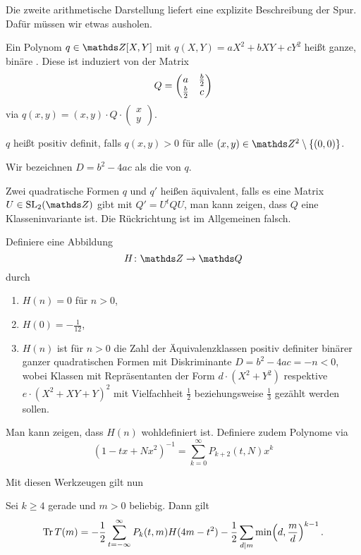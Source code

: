 Die zweite arithmetische Darstellung liefert eine explizite Beschreibung der Spur.
Dafür müssen wir etwas ausholen.

\begin{defi}
	Ein Polynom $q \in \ZZ[X, Y]$ mit $q(X,Y) = aX^2 + bXY + cY^2$ heißt ganze, binäre .
	Diese ist induziert von der Matrix
	\[
	Q = \mymat*{a}{\frac{b}{2}}{\frac{b}{2}}{c}
	\]
	via $q(x,y) = (x, y) \cdot Q \cdot (\begin{smallmatrix} x \\ y \end{smallmatrix})$.
	
	$q$ heißt positiv definit, falls $q(x,y) > 0$ für alle $(x,y) \in \ZZ^2\setminus\{(0,0)\}$.
	
	Wir bezeichnen $D = b^2 - 4ac$ als die  von $q$.
	
	Zwei quadratische Formen $q$ und $q'$ heißen äquivalent, falls es eine Matrix $U \in \SL_2(\ZZ)$ gibt mit $Q' = U^t Q U$, man kann zeigen, dass $Q$ eine Klasseninvariante ist.
	Die Rückrichtung ist im Allgemeinen falsch.
	
	Definiere eine Abbildung
	\[
	H\colon \ZZ \ra \QQ
	\]
	durch
	\begin{enumerate}
		\item $H(n) = 0$ für $n > 0$,
		\item $H(0) = - \frac{1}{12}$,
		\item $H(n)$ ist für $n > 0$ die Zahl der Äquivalenzklassen positiv definiter binärer ganzer quadratischen Formen mit Diskriminante $D = b^2-4ac = -n < 0$, wobei Klassen mit Repräsentanten der Form $d\cdot (X^2 + Y^2)$ respektive $e \cdot (X^2 + XY + Y)^2$ mit Vielfachheit $\frac{1}{2}$ beziehungsweise $\frac{1}{3}$ gezählt werden sollen.
	\end{enumerate}
	Man kann zeigen, dass $H(n)$ wohldefiniert ist.
	Definiere zudem Polynome via
	\[
	(1-tx+Nx^2)^{-1} = \sum_{k=0}^\infty P_{k+2}(t,N) x^k
	\]
\end{defi}

Mit diesen Werkzeugen gilt nun
\begin{theorem}
	Sei $k \geq 4$ gerade und $m > 0$ beliebig. Dann gilt
	\begin{equation}\label{eq:arithmetischeSpurformel}
	\operatorname{Tr} T(m) = -\frac{1}{2} \sum_{t=-\infty}^\infty P_k(t,m) H(4m-t^2) - \frac{1}{2} \sum_{d|m} \min\Bigl(d, \frac{m}{d}\Bigr)^{k-1}\,.
	\end{equation}
\end{theorem}

